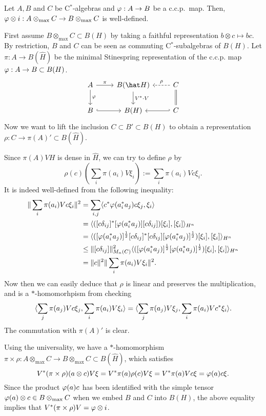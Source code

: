 \documentclass{../../../small}
\begin{document}
\begin{prop}
Let $A, B$ and $ C$ be C$^*$-algebras and $\varphi:A\to B$ be a c.c.p.~map.
Then, $\varphi\otimes i:A\otimes_{\max} C\to B\otimes_{\max} C$ is well-defined.
\end{prop}
\begin{pf}
First assume $B\otimes_{\max} C\subset B(H)$ by taking a faithful representation $b\otimes c\mapsto bc$.
By restriction, $B$ and $ C$ can be seen as commuting C$^*$-subalgebras of $B(H)$.
Let $\pi:A\to B(\hat H)$ be the minimal Stinespring representation of the c.c.p. map $\varphi:A\to B\subset B(H)$.
\[\begin{tikzcd}
 A\ar{d}{\f}\ar{r}{\pi}&B(\hat H)\ar{d}{V^*\cdot V}& C\ar[equal]{d}\ar[dashed,swap]{l}{\rho}\\
 B\ar[hook]{r}&B(H)& C\ar[hook']{l}
\end{tikzcd}\]
Now we want to lift the inclusion $ C\subset B'\subset B(H)$ to obtain a representation $\rho: C\to\pi(A)'\subset B(\hat H)$.

Since $\pi(A)VH$ is dense in $\hat H$, we can try to define $\rho$ by
\[\rho(c)(\sum_i\pi(a_i)V\xi_i):=\sum_i\pi(a_i)Vc\xi_i.\]
It is indeed well-defined from the following inequality:
\begin{align*}
\|\sum_i\pi(a_i)Vc\xi_i\|^2
&=\sum_{i,j}\langle c^*\varphi(a_i^*a_j)c\xi_j,\xi_i\rangle\\
&=\langle([c\delta_{ij}]^*[\varphi(a_i^*a_j)][c\delta_{ij}])[\xi_i],[\xi_i]\rangle_{H^n}\\
&=\langle([\varphi(a_i^*a_j)]^{\frac12}[c\delta_{ij}]^*[c\delta_{ij}][\varphi(a_i^*a_j)]^{\frac12})[\xi_i],[\xi_i]\rangle_{H^n}\\
&\le\|[c\delta_{ij}]\|_{M_n( C)}^2\langle([\varphi(a_i^*a_j)]^{\frac12}[\varphi(a_i^*a_j)]^{\frac12})[\xi_i],[\xi_i]\rangle_{H^n}\\
&=\|c\|^2\|\sum_i\pi(a_i)V\xi_i\|^2.
\end{align*}
Now then we can easily deduce that $\rho$ is linear and preserves the multiplication, and is a $*$-homomorhpism from checking
\[\langle\sum_j\pi(a_j)Vc\xi_j,\sum_i\pi(a_i)V\xi_i\rangle=\langle\sum_j\pi(a_j)V\xi_j,\sum_i\pi(a_i)Vc^*\xi_i\rangle.\]
The commutation with $\pi(A)'$ is clear.

Using the universality, we have a $*$-homomorphism $\pi\times\rho:A\otimes_{\max} C\to B\otimes_{\max} C\subset B(\hat H)$, which satisfies
\[V^*(\pi\times\rho)(a\otimes c)V\xi=V^*\pi(a)\rho(c)V\xi=V^*\pi(a)Vc\xi=\varphi(a)c\xi.\]
Since the product $\varphi(a)c$ has been identified with the simple tensor $\varphi(a)\otimes c\in B\otimes_{\max} C$ when we embed $B$ and $ C$ into $B(H)$, the above equality implies that $V^*(\pi\times\rho)V=\varphi\otimes i$.
\end{pf}
\end{document}
